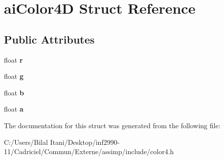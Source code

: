 \hypertarget{structai_color4_d}{}\section{ai\+Color4D Struct Reference}
\label{structai_color4_d}
\subsection*{Public Attributes}
\begin{DoxyCompactItemize}
\item 
float {\bfseries r}\hypertarget{structai_color4_d_a989c2117cfae5a4457fa65f0257e93c7}{}\label{structai_color4_d_a989c2117cfae5a4457fa65f0257e93c7}

\item 
float {\bfseries g}\hypertarget{structai_color4_d_a32e929c7db12fb6f79f74a611f6d8fe6}{}\label{structai_color4_d_a32e929c7db12fb6f79f74a611f6d8fe6}

\item 
float {\bfseries b}\hypertarget{structai_color4_d_ab64376fc730371f8952f5f98084b2430}{}\label{structai_color4_d_ab64376fc730371f8952f5f98084b2430}

\item 
float {\bfseries a}\hypertarget{structai_color4_d_a1bf4f719c14e844dcd7ce5a1c1969c89}{}\label{structai_color4_d_a1bf4f719c14e844dcd7ce5a1c1969c89}

\end{DoxyCompactItemize}


The documentation for this struct was generated from the following file\+:\begin{DoxyCompactItemize}
\item 
C\+:/\+Users/\+Bilal Itani/\+Desktop/inf2990-\/11/\+Cadriciel/\+Commun/\+Externe/assimp/include/color4.\+h\end{DoxyCompactItemize}

